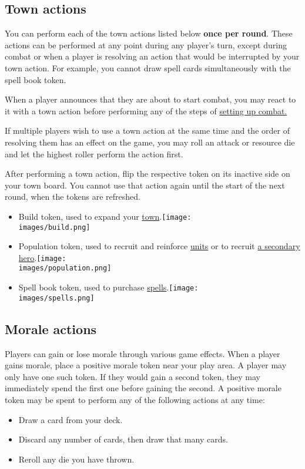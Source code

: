 \clearpage

\subsection*{Town actions}
You can perform each of the town actions listed below \textbf{once per round}.
These actions can be performed at any point during any player’s turn, except during combat or when a player is resolving an action that would be interrupted by your town action.
For example, you cannot draw spell cards simultaneously with the spell book token.\par
When a player announces that they are about to start combat, you may react to it with a town action before performing any of the steps of
\hyperlink{Combatsetup}{setting up combat.}\par
If multiple players wish to use a town action at the same time and the order of resolving them has an effect on the game, you may roll an attack or resource die and let the highest roller perform the action first.\par
After performing a town action, flip the respective token on its inactive side on your town board.
You cannot use that action again until the start of the next round, when the tokens are refreshed.
\begin{itemize}
  \item Build token, used to expand your \hyperlink{Town}{town}.\texttt{[image: \\images/build.png]}
  \item Population token, used to recruit and reinforce \hyperlink{Units}{units} or to recruit \hyperlink{Secondary}{a secondary hero}.\texttt{[image: \\images/population.png]}
  \item Spell book token, used to purchase \hyperlink{spells}{spells}.\texttt{[image: \\images/spells.png]}
\end{itemize}

\subsection*{Morale actions}
Players can gain or lose morale through various game effects.
When a player gains morale, place a positive morale token  near your play area.
A player may only have one such token.
If they would gain a second token, they may immediately spend the first one before gaining the second.
A positive morale token may be spent to perform any of the following actions at any time:
\begin{itemize}
\item Draw a card from your deck.
\item Discard any number of cards, then draw that many cards.
\item Reroll any die you have thrown.
\end{itemize}

